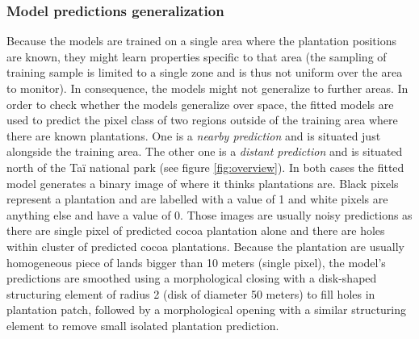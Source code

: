 \documentclass[a4paper, 12pt]{article}
\begin{document}
        \subsubsection{Model predictions generalization}
            Because the models are trained on a single area where the plantation positions are known, they might learn properties specific to that area (the sampling of training sample is limited to a single zone and is thus not uniform over the area to monitor). In consequence, the models might not generalize to further areas. In order to check whether the models generalize over space, the fitted models are used to predict the pixel class of two regions outside of the training area where there are known plantations. One is a \textit{nearby prediction} and is situated just alongside the training area. The other one is a \textit{distant prediction} and is situated north of the Taï national park (see figure \ref{fig:overview}). In both cases the fitted model generates a binary image of where it thinks plantations are. Black pixels represent a plantation and are labelled with a value of 1 and white pixels are anything else and have a value of 0. Those images are usually noisy predictions as there are single pixel of predicted cocoa plantation alone and there are holes within cluster of predicted cocoa plantations. Because the plantation are usually homogeneous piece of lands bigger than 10 meters (single pixel), the model's predictions are smoothed using a morphological closing with a disk-shaped structuring element of radius 2 (disk of diameter 50 meters) to fill holes in plantation patch, followed by a morphological opening with a similar structuring element to remove small isolated plantation prediction.
\end{document}
